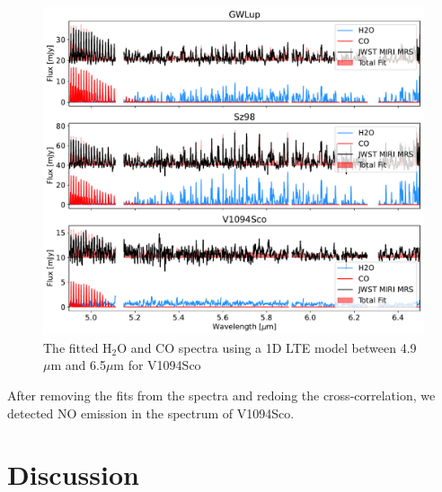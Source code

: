 \documentclass[oneside, single, authoryear, semicolon]{lion-msc}
\newcommand{\4}{$_4$}
\newcommand{\3}{$_3$}
\newcommand{\2}{$_2$}
\begin{document}
\begin{figure}[!ht]
    \centering
    \includegraphics[width=\linewidth]{Figures/Fits.pdf}
    \caption{The fitted H\2O and CO spectra using a 1D LTE model between 4.9 $\mu$m and 6.5$\mu$m for V1094Sco}
    \label{fig: v1094sco}
\end{figure}

After removing the fits from the spectra and redoing the cross-correlation, we detected NO emission in the spectrum of V1094Sco.

\chapter{Discussion}\label{Ch: Discussion}
\end{document}
